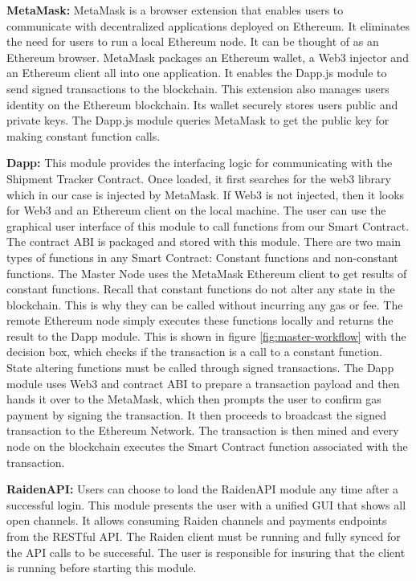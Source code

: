 \textbf{MetaMask:}
MetaMask is a browser extension that enables users to communicate with decentralized applications deployed on Ethereum. It eliminates the need for users to run a local Ethereum node. It can be thought of as an Ethereum browser. MetaMask packages an Ethereum wallet, a Web3 injector and an Ethereum client all into one application. It enables the Dapp.js module to send signed transactions to the blockchain. This extension also manages users identity on the Ethereum blockchain. Its wallet securely stores users public and private keys. The Dapp.js module queries MetaMask to get the public key for making constant function calls.

\textbf{Dapp:}
This module provides the interfacing logic for communicating with the Shipment Tracker Contract. Once loaded, it first searches for the web3 library which in our case is injected by MetaMask. If Web3 is not injected, then it looks for Web3 and an Ethereum client on the local machine. The user can use the graphical user interface of this module to call functions from our Smart Contract. The contract ABI is packaged and stored with this module. There are two main types of functions in any Smart Contract: Constant functions and non-constant functions. The Master Node uses the MetaMask Ethereum client to get results of constant functions. Recall that constant functions do not alter any state in the blockchain. This is why they can be called without incurring any gas or fee. The remote Ethereum node simply executes these functions locally and returns the result to the Dapp module. This is shown in figure \ref{fig:master-workflow} with the decision box, which checks if the transaction is a call to a constant function. State altering functions must be called through signed transactions. The Dapp module uses Web3 and contract ABI to prepare a transaction payload and then hands it over to the MetaMask, which then prompts the user to confirm gas payment by signing the transaction. It then proceeds to broadcast the signed transaction to the Ethereum Network. The transaction is then mined and every node on the blockchain executes the Smart Contract function associated with the transaction.

\textbf{RaidenAPI:}
Users can choose to load the RaidenAPI module any time after a successful login. This module presents the user with a unified GUI that shows all open channels. It allows consuming Raiden channels and payments endpoints from the RESTful API. The Raiden client must be running and fully synced for the API calls to be successful. The user is responsible for insuring that the client is running before starting this module. 

